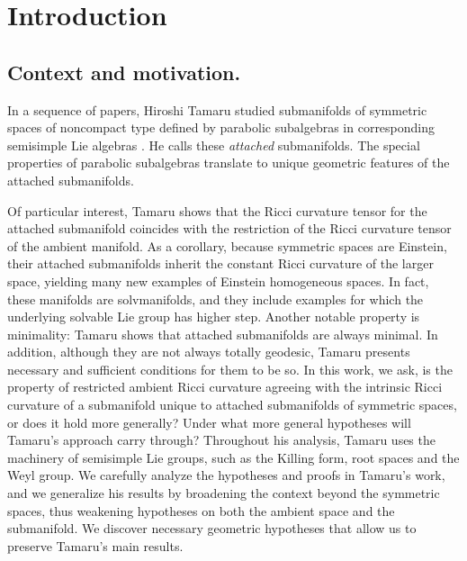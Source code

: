\documentclass[12pt]{amsart}
\theoremstyle{plain}
\theoremstyle{definition}
\theoremstyle{remark}
\numberwithin{equation}{section}
\numberwithin{theorem}{section}
\begin{document}
\section{Introduction}\label{introduction}

\subsection{Context and motivation.}
 In a sequence of papers, Hiroshi 
Tamaru studied submanifolds of symmetric spaces of noncompact type defined by parabolic subalgebras in corresponding semisimple Lie algebras \cite{tamaru-08, tamaru-11, tamaru-11b}. He calls these {\em attached} submanifolds.   The special properties of parabolic subalgebras translate to unique geometric features of the attached submanifolds.

Of particular interest, Tamaru shows  that  the Ricci curvature tensor for the  attached submanifold coincides with the restriction of the Ricci curvature tensor of the  ambient manifold. 
 As a corollary, because symmetric spaces are Einstein,  their attached  submanifolds
 inherit the constant Ricci curvature of the larger space, yielding many new examples of
 Einstein homogeneous spaces.  In fact, these manifolds are  solvmanifolds, and they
 include examples for which the underlying solvable Lie group has higher step. 
 Another notable property is minimality: Tamaru shows that attached submanifolds are
 always minimal. 
In addition, although they are not always totally geodesic, Tamaru presents necessary
and sufficient conditions for them to be so.
In this work,
we ask,  is  the property of restricted ambient Ricci curvature agreeing with the
intrinsic Ricci curvature of a submanifold unique to attached submanifolds of symmetric
spaces, or does it hold more generally?  Under what more general hypotheses  will
Tamaru's approach carry through?  Throughout his analysis, Tamaru uses the  machinery of
semisimple Lie groups, such as the Killing form, root spaces and the Weyl group.
We carefully analyze the hypotheses and proofs in Tamaru's work, and we generalize his
results by  broadening the context beyond the symmetric spaces, thus weakening
hypotheses on both the ambient space and the submanifold. We discover necessary
geometric hypotheses that allow us to preserve Tamaru's main results.
\end{document}
